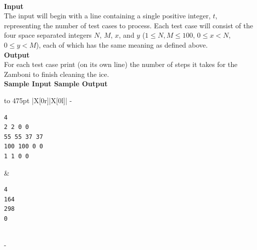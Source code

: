 \documentclass[a4paper,11pt]{article}
\begin{document}
\vspace{7mm}\\
\large{\bf{Input}}\vspace{2mm}\\
The input will begin with a line containing a single positive integer, $t$, representing the number of test cases to process. Each test case will consist of the four space separated integers $N$, $M$, $x$, and $y$ ($1 \leq N, M \leq 100$, $0 \leq x < N$, $0 \leq y < M$), each of which has the same meaning as defined above.
\vspace{3mm}\\
\large{\bf{Output}}\vspace{2mm}\\
For each test case print (on its own line) the number of steps it takes for the Zamboni to finish cleaning the ice.
\vspace{5mm}\\
\bf{Sample Input} \hspace{52mm} \bf{Sample Output}\vspace{1mm}\\
\begin{tabu*} to 475pt {|X[0r]|X[0l]|}
\tabucline-
\vspace{-\baselineskip} %
\begin{Verbatim}
4
2 2 0 0
55 55 37 37
100 100 0 0
1 1 0 0
\end{Verbatim}
&
\vspace{-\baselineskip} %
\begin{Verbatim}
4
164
298
0
\end{Verbatim}
\\
\tabucline-
\end{tabu*}
\end{document}
